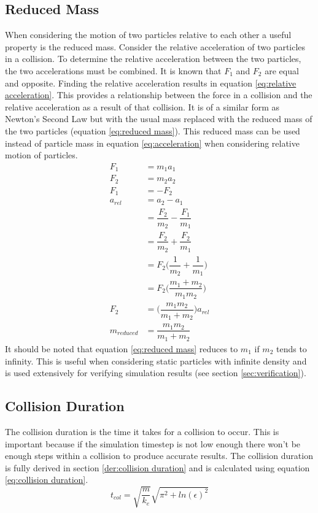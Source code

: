 \documentclass[10pt,a4paper,titlepage]{report}
\begin{document}
\subsection{Reduced Mass}
When considering the motion of two particles relative to each other a useful property is the reduced mass. Consider the relative acceleration of two particles in a collision. To determine the relative acceleration between the two particles, the two accelerations must be combined. It is known that $F_1$ and $F_2$ are equal and opposite. Finding the relative acceleration results in equation \ref{eq:relative acceleration}. This provides a relationship between the force in a collision and the relative acceleration as a result of that collision. It is of a similar form as Newton's Second Law but with the usual mass replaced with the reduced mass of the two particles (equation \ref{eq:reduced mass}). This reduced mass can be used instead of particle mass in equation \ref{eq:acceleration} when considering relative motion of particles.
\begin{align}
F_1 &= m_1 a_1 \nonumber
\\F_2 &= m_2 a_2 \nonumber
\\F_1 &= -F_2 \nonumber
\\a_{rel} &= a_2 - a_1 \nonumber
\\&= \dfrac{F_2}{m_2} - \dfrac{F_1}{m_1} \nonumber
\\&= \dfrac{F_2}{m_2} + \dfrac{F_2}{m_1} \nonumber
\\&= F_2 \Big(\dfrac{1}{m_2} + \dfrac{1}{m_1}\Big) \nonumber
\\&= F_2 \Big(\dfrac{m_1 + m_2}{m_1 m_2}\Big) \nonumber
\\F_2 &= \Big(\dfrac{m_1 m_2}{m_1 + m_2}\Big) a_{rel} \label{eq:relative acceleration}
\\m_{reduced} &= \dfrac{m_1 m_2}{m_1 + m_2} \label{eq:reduced mass}
\end{align}
It should be noted that equation \ref{eq:reduced mass} reduces to $m_1$ if $m_2$ tends to infinity. This is useful when considering static particles with infinite density and is used extensively for verifying simulation results (see section \ref{sec:verification}).
\subsection{Collision Duration}
The collision duration is the time it takes for a collision to occur. This is important because if the simulation timestep is not low enough there won't be enough steps within a collision to produce accurate results. The collision duration is fully derived in section \ref{der:collision duration} and is calculated using equation \ref{eq:collision duration}.
\begin{equation}
t_{col} = \sqrt{\dfrac{m}{k_e}}\sqrt{\pi^2 + ln(\epsilon)^2}
\label{eq:collision duration}
\end{equation}
\end{document}
